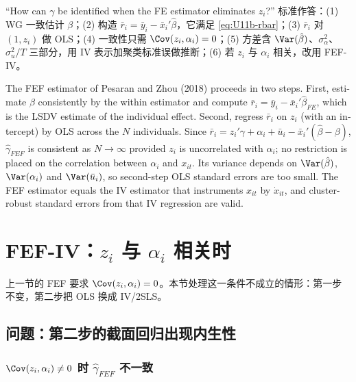 \begin{keypt}[英文试卷常见问法]
“How can $\gamma$ be identified when the FE estimator eliminates $z_i$?” 标准作答：(1) WG 一致估计 $\beta$；(2) 构造 $\bar r_i=\bar y_i-\bar x_i'\hat\beta$，它满足 \eqref{eq:U11b-rbar}；(3) $\bar r_i$ 对 $(1,z_i)$ 做 OLS；(4) 一致性只需 $\Cov(z_i,\alpha_i)=0$；(5) 方差含 $\Var(\hat\beta)$、$\sigma_\alpha^2$、$\sigma_u^2/T$ 三部分，用 IV 表示加聚类标准误做推断；(6) 若 $z_i$ 与 $\alpha_i$ 相关，改用 FEF-IV。
\end{keypt}

\begin{english}
The FEF estimator of Pesaran and Zhou (2018) proceeds in two steps. First, estimate $\beta$ consistently by the within estimator and compute $\bar r_i=\bar y_i-\bar x_i'\hat\beta_{FE}$, which is the LSDV estimate of the individual effect. Second, regress $\bar r_i$ on $z_i$ (with an intercept) by OLS across the $N$ individuals. Since $\bar r_i=z_i'\gamma+\alpha_i+\bar u_i-\bar x_i'(\hat\beta-\beta)$, $\hat\gamma_{FEF}$ is consistent as $N\to\infty$ provided $z_i$ is uncorrelated with $\alpha_i$; no restriction is placed on the correlation between $\alpha_i$ and $x_{it}$. Its variance depends on $\Var(\hat\beta)$, $\Var(\alpha_i)$ and $\Var(\bar u_i)$, so second-step OLS standard errors are too small. The FEF estimator equals the IV estimator that instruments $x_{it}$ by $\dot x_{it}$, and cluster-robust standard errors from that IV regression are valid.
\end{english}

\section{FEF-IV：\texorpdfstring{$z_i$}{z\_i} 与 \texorpdfstring{$\alpha_i$}{alpha\_i} 相关时}\label{sec:U11b-fefiv}

上一节的 FEF 要求 $\Cov(z_i,\alpha_i)=0$。本节处理这一条件不成立的情形：第一步不变，第二步把 OLS 换成 IV/2SLS。

\subsection{问题：第二步的截面回归出现内生性}

\subsubsection{\texorpdfstring{$\Cov(z_i,\alpha_i)\neq0$}{Cov(z, alpha) != 0} 时 \texorpdfstring{$\hat\gamma_{FEF}$}{gamma\_FEF} 不一致}

